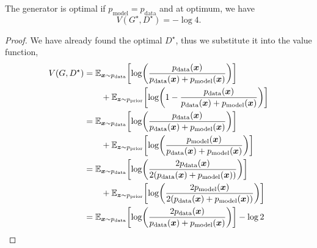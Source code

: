 \begin{theorem}
    \label{thm:generator-optimality}
    The generator is optimal if $p_{\mathrm{model}} = p_{\mathrm{data}}$ and at optimum, we have \[
        V(G^\star, D^\star) = -\log 4.
    \]
\end{theorem}

\begin{proof}
    We have already found the optimal $D^\star$, thus we substitute it into the value function,
    \begin{align*}
        V(G, D^\star) & = \E_{\vec{x} \sim p_{\mathrm{data}}} \lft[ \log \lft( \frac{p_{\mathrm{data}}(\vec{x})}{p_{\mathrm{data}}(\vec{x}) + p_{\mathrm{model}}(\vec{x})} \rgt) \rgt]                                                                          \\
                      & \quad\quad + \E_{\vec{z} \sim p_{\mathrm{prior}}} \lft[ \log \lft( 1 - \frac{p_{\mathrm{data}}(\vec{x})}{p_{\mathrm{data}}(\vec{x}) + p_{\mathrm{model}}(\vec{x})} \rgt) \rgt]                                                          \\
                      & = \E_{\vec{x} \sim p_{\mathrm{data}}} \lft[ \log \lft( \frac{p_{\mathrm{data}}(\vec{x})}{p_{\mathrm{data}}(\vec{x}) + p_{\mathrm{model}}(\vec{x})} \rgt) \rgt]                                                                          \\
                      & \quad\quad + \E_{\vec{z} \sim p_{\mathrm{prior}}} \lft[ \log \lft( \frac{p_{\mathrm{model}}(\vec{x})}{p_{\mathrm{data}}(\vec{x}) + p_{\mathrm{model}}(\vec{x})} \rgt) \rgt]                                                             \\
                      & = \E_{\vec{x} \sim p_{\mathrm{data}}} \lft[ \log \lft( \frac{2 p_{\mathrm{data}}(\vec{x})}{2 (p_{\mathrm{data}}(\vec{x}) + p_{\mathrm{model}}(\vec{x}))} \rgt) \rgt]                                                                    \\
                      & \quad\quad + \E_{\vec{z} \sim p_{\mathrm{prior}}} \lft[ \log \lft( \frac{2 p_{\mathrm{model}}(\vec{x})}{2 (p_{\mathrm{data}}(\vec{x}) + p_{\mathrm{model}}(\vec{x}))} \rgt) \rgt]                                                       \\
                      & = \E_{\vec{x} \sim p_{\mathrm{data}}} \lft[ \log \lft( \frac{2 p_{\mathrm{data}}(\vec{x})}{p_{\mathrm{data}}(\vec{x}) + p_{\mathrm{model}}(\vec{x})} \rgt) \rgt] - \log 2                                                               \\

\end{align*}
\end{proof}
